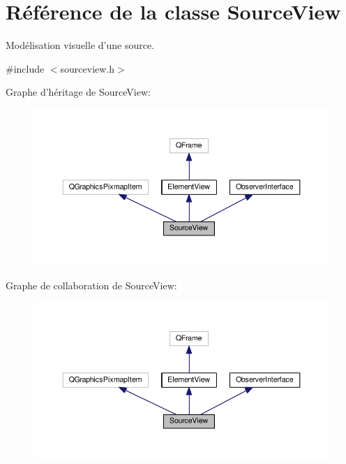 \hypertarget{classSourceView}{\section{Référence de la classe Source\+View}
\label{classSourceView}
}


Modélisation visuelle d’une source.  




{\ttfamily \#include $<$sourceview.\+h$>$}



Graphe d'héritage de Source\+View\+:\nopagebreak
\begin{figure}[H]
\begin{center}
\leavevmode
\includegraphics[width=350pt]{de/ddc/classSourceView__inherit__graph}
\end{center}
\end{figure}


Graphe de collaboration de Source\+View\+:\nopagebreak
\begin{figure}[H]
\begin{center}
\leavevmode
\includegraphics[width=350pt]{d2/df3/classSourceView__coll__graph}
\end{center}
\end{figure}
